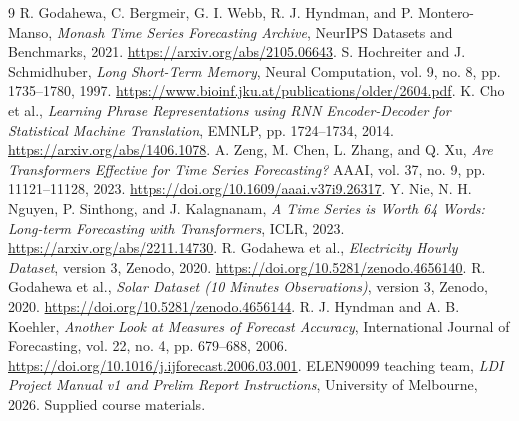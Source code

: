 \begin{thebibliography}{9}
\small
{} R. Godahewa, C. Bergmeir, G. I. Webb, R. J. Hyndman, and P. Montero-Manso, \emph{Monash Time Series Forecasting Archive}, NeurIPS Datasets and Benchmarks, 2021. \url{https://arxiv.org/abs/2105.06643}.
 S. Hochreiter and J. Schmidhuber, \emph{Long Short-Term Memory}, Neural Computation, vol. 9, no. 8, pp. 1735--1780, 1997. \url{https://www.bioinf.jku.at/publications/older/2604.pdf}.
 K. Cho et al., \emph{Learning Phrase Representations using RNN Encoder-Decoder for Statistical Machine Translation}, EMNLP, pp. 1724--1734, 2014. \url{https://arxiv.org/abs/1406.1078}.
 A. Zeng, M. Chen, L. Zhang, and Q. Xu, \emph{Are Transformers Effective for Time Series Forecasting?} AAAI, vol. 37, no. 9, pp. 11121--11128, 2023. \url{https://doi.org/10.1609/aaai.v37i9.26317}.
 Y. Nie, N. H. Nguyen, P. Sinthong, and J. Kalagnanam, \emph{A Time Series is Worth 64 Words: Long-term Forecasting with Transformers}, ICLR, 2023. \url{https://arxiv.org/abs/2211.14730}.
 R. Godahewa et al., \emph{Electricity Hourly Dataset}, version 3, Zenodo, 2020. \url{https://doi.org/10.5281/zenodo.4656140}.
 R. Godahewa et al., \emph{Solar Dataset (10 Minutes Observations)}, version 3, Zenodo, 2020. \url{https://doi.org/10.5281/zenodo.4656144}.
 R. J. Hyndman and A. B. Koehler, \emph{Another Look at Measures of Forecast Accuracy}, International Journal of Forecasting, vol. 22, no. 4, pp. 679--688, 2006. \url{https://doi.org/10.1016/j.ijforecast.2006.03.001}.
 ELEN90099 teaching team, \emph{LDI Project Manual v1 and Prelim Report Instructions}, University of Melbourne, 2026. Supplied course materials.
\end{thebibliography}
